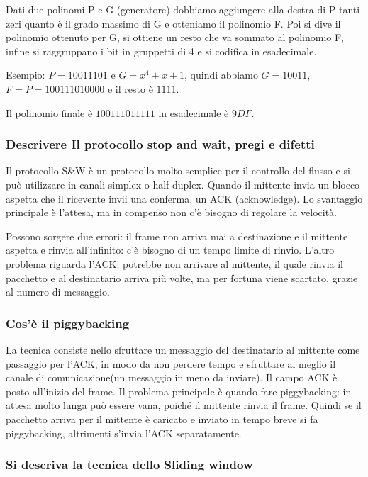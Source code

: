 Dati due polinomi P e G (generatore) dobbiamo aggiungere alla destra di P tanti zeri quanto è il
grado massimo di G e otteniamo il polinomio F. Poi si dive il polinomio ottenuto per G, si ottiene un resto che va sommato al polinomio F, infine si raggruppano i bit in gruppetti di 4 e si codifica in esadecimale.

Esempio: $P=10011101$ e $G= x^4+x+1$, quindi abbiamo $G=10011$, $F= P=100111010000$ e il resto è $1111$.

Il polinomio finale è $1001 1101 1111$ in esadecimale è $9DF$.

\subsubsection{Descrivere Il protocollo stop and wait, pregi e difetti}

Il protocollo S\&W è un protocollo molto semplice per il controllo del flusso e si può utilizzare in
canali simplex o half-duplex. Quando il mittente invia un blocco aspetta che il ricevente invii una
conferma, un ACK (acknowledge). Lo svantaggio principale è l'attesa, ma in compenso non c'è
bisogno di regolare la velocità.

Possono sorgere due errori: il frame non arriva mai a destinazione e il mittente aspetta e rinvia
all'infinito: c'è bisogno di un tempo limite di rinvio. L'altro problema riguarda l'ACK: potrebbe non arrivare al mittente, il quale rinvia il pacchetto e al destinatario arriva più volte, ma per fortuna viene scartato, grazie al numero di messaggio.

\subsubsection{Cos’è il piggybacking}

La tecnica consiste nello sfruttare un messaggio del destinatario al mittente come passaggio per
l’ACK, in modo da non perdere tempo e sfruttare al meglio il canale di comunicazione(un messaggio
in meno da inviare). Il campo ACK è posto all’inizio del frame. Il problema principale è quando fare
piggybacking: in attesa molto lunga può essere vana, poiché il mittente rinvia il frame. Quindi se il pacchetto arriva per il mittente è caricato e inviato in tempo breve si fa piggybacking, altrimenti s’invia l’ACK separatamente.

\subsubsection{Si descriva la tecnica dello Sliding window}

